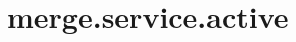 \section{merge.service.active}
\label{configuration:MergeServiceActive}
\AvailableInCsharpOnly{\TODO}